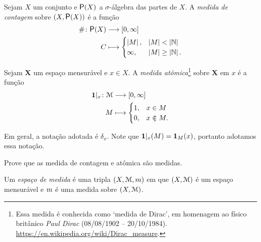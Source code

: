 \begin{definition}
Sejam $X$ um conjunto e $\p(X)$ a $\sigma$-álgebra das partes de $X$. A \emph{medida de contagem} sobre $(X,\p(X))$ é a função
	\begin{align*}
	\func{\#}{\p(X)}{\intff{0}{\infty}}{C}{
		\begin{cases}
			\card{M},& \card{M}<\card{\N} \\
			\infty,& \card{M} \geq \card{\N}.
		\end{cases}
	}
	\end{align*}
\end{definition}

\begin{definition}
Sejam $\bm X$ um espaço mensurável e $x \in X$. A \emph{medida atômica}\footnote{Essa medida é conhecida como `medida de Dirac', em homenagem ao físico britânico \textit{Paul Dirac} (08/08/1902 -- 20/10/1984). \url{https://en.wikipedia.org/wiki/Dirac_measure}.} sobre $\bm X$ em $x$ é a função
	\begin{align*}
	\func{\idc|_x}{\mens}{\intff{0}{\infty}}{M}{
		\begin{cases}
			1,& x \in M \\
			0,& x \notin M.
		\end{cases}
	}
	\end{align*}
\end{definition}

Em geral, a notação adotada é $\delta_x$. Note que ${\bm 1}|_x(M) = {\bm 1}_M(x)$, portanto adotamos essa notação.

\begin{example}
Prove que as medida de contagem e atômica são medidas.
\end{example}

\begin{definition}
Um \emph{espaço de medida} é uma tripla $(X,\mathcal{M},m)$ em que $(X,\mathcal{M})$ é um espaço mensurável e $m$ é uma medida sobre $(X,\mathcal{M})$.
\end{definition}

